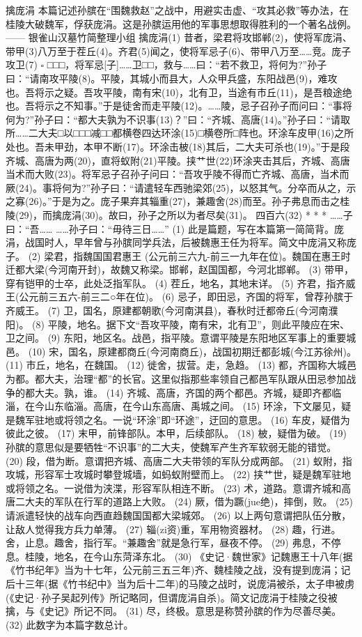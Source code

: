 \documentclass[12pt,UTF8]{ctexbook}
\begin{document}
擒庞涓
本篇记述孙膑在“围魏救赵”之战中，用避实击虚、“攻其必救”等办法，在桂陵大破魏军，俘获庞涓。这是孙膑运用他的军事思想取得胜利的一个著名战例。
—— 银雀山汉墓竹简整理小组
擒庞涓(1)
昔者，梁君将攻邯郸(2)，使将军庞涓、带甲(3)八万至于茬丘(4)。齐君(5)闻之，使将军忌子(6)、带甲八万至……竞。庞子攻卫(7) \( \square \) □□□，将军忌[子]……卫□□，救与……曰：“若不救卫，将何为?”孙子曰：“请南攻平陵(8)。平陵，其城小而县大，人众甲兵盛，东阳战邑(9)，难攻也。吾将示之疑。吾攻平陵，南有宋(10)，北有卫，当途有市丘(11)，是吾粮途绝也。吾将示之不知事。”于是徒舍而走平陵(12)。……陵，忌子召孙子而问曰：“事将何为?”孙子曰：“都大夫孰为不识事(13)？”曰：“齐城、高唐(14)。”孙子曰：“请取所……二大夫□以□□□减□□都横卷四达环涂(15)□横卷所□阵也。环涂{车皮}甲(16)之所处也。吾未甲劲，本甲不断(17)。环涂击柀(18)其后，二大夫可杀也(19)。”于是段齐城、高唐为两(20)，直将蚁附(21)平陵。挟{艹世}(22)环涂夹击其后，齐城、高唐当术而大败(23)。将军忌子召孙子问曰：“吾攻乎陵不得而亡齐城、高唐，当术而厥(24)。事将何为?”孙子曰：“请遣轻车西驰梁郊(25)，以怒其气。分卒而从之，示之寡(26)。”于是为之。庞子果弃其辎重(27)，兼趣舍(28)而至。孙子弗息而击之桂陵(29)，而擒庞涓(30)。故曰，孙子之所以为者尽矣(31)。
四百六(32)
* * *
……子曰：“吾……
……孙子曰：“毋待三日……”
(1) 此是篇题，写在本篇第一简简背。庞涓，战国时人，早年曾与孙膑同学兵法，后被魏惠王任为将军。简文中庞涓又称庞子。
(2) 梁君，指魏国国君惠王 (公元前三六九-前三一九年在位)。魏国在惠王时迁都大梁(今河南开封)，故魏又称梁。邯郸，赵国国都，今河北邯郸。
(3) 带甲，穿有铠甲的士卒，此处泛指军队。
(4) 茬丘，地名，其地末详。
(5) 齐君，指齐威王(公元前三五六-前三二○年在位)。
(6) 忌子，即田忌，齐国的将军，曾荐孙膑于齐威王。
(7) 卫，国名，原建都朝歌(今河南淇县)，春秋时迁都帝丘(今河南濮阳)。
(8) 平陵，地名。据下文“吾攻平陵，南有宋，北有卫”，则此平陵应在宋、卫之间。
(9) 东阳，地区名。战邑，指平陵。意谓平陵是东阳地区军事上的重要城邑。
(10) 宋，国名，原建都商丘(今河南商丘)，战国初期迁都彭城(今江苏徐州)。
(11) 市丘，地名，在魏国。
(12) 徙舍，拔营。走，急趋。
(13) 都，齐国称大城邑为都。都大夫，治理“都”的长官。这里似指那些率领自己都邑军队跟从田忌参加战争的都大夫。孰，谁。
(14) 齐城、高唐，齐国的两个都邑。齐城，疑即齐都临淄，在今山东临淄。高唐，在今山东高唐、禹城之间。
(15) 环涂，下文屡见，疑是魏军驻地或将领之名。一说“环涂”即“环途”，迂回的意思。
(16) {车皮}，疑借为彼此之彼。
(17) 末甲，前锋部队。本甲，后续部队。
(18) 柀，疑借为破。
(19) 孙膑的意思似是要牺牲“不识事”的二大夫，使魏军产生齐军软弱无能的错觉。
(20) 段，借为断。意谓把齐城、高唐二大夫带领的军队分成两部。
(21) 蚁附，指攻城，形容军士攻城时攀登城墙，如蚂蚁附壁而上。
(22) 挟{艹世}，疑是魏军驻地或将领之名。一说借为浃渫，形容军队相连不断。
(23) 术，道路。意谓齐城和高唐二大夫的军队在行军的道路上大败。
(24) 厥，借为蹶(jue绝)，摔倒，败。
(25) 请派遣轻快的战车向西直趋魏国国都大梁城郊。
(26) 以上两句意谓把队伍分散，让敌人觉得我方兵力单薄。
(27) 辎(zi资)重，军用物资器材。
(28) 趣，行进。舍，止息。趣舍，指行军。“兼趣舍”就是急行军，昼夜不停。
(29) 弗息，不停息。桂陵，地名，在今山东菏泽东北。
(30) 《史记·魏世家》记魏惠王十八年(据《竹书纪年》当为十七年，公元前三五三年)齐、魏桂陵之战，没有提到庞涓；记后十三年(据《竹书纪中》当为后十二年)的马陵之战时，说庞涓被杀，太子申被虏(《史记·孙子吴起列传》所记略同，但谓庞涓自杀)。简文记庞涓于桂陵之役被擒，与《史记》所记不同。
(31) 尽，终极。意思是称赞孙膑的作为尽善尽美。
(32) 此数字为本篇字数总计。
\end{document}
